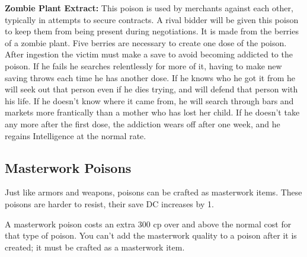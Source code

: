 \textbf{Zombie Plant Extract:} This poison is used by merchants against each other, typically in attempts to secure contracts. A rival bidder will be given this poison to keep them from being present during negotiations. It is made from the berries of a zombie plant. Five berries are necessary to create one dose of the poison. After ingestion the victim must make a save to avoid becoming addicted to the poison. If he fails he searches relentlessly for more of it, having to make new saving throws each time he has another dose. If he knows who he got it from he will seek out that person even if he dies trying, and will defend that person with his life. If he doesn't know where it came from, he will search through bars and markets more frantically than a mother who has lost her child. If he doesn't take any more after the first dose, the addiction wears off after one week, and he regains Intelligence at the normal rate.

\subsection{Masterwork Poisons}
Just like armors and weapons, poisons can be crafted as masterwork items. These poisons are harder to resist, their save DC increases by 1.

A masterwork poison costs an extra 300 cp over and above the normal cost for that type of poison. You can't add the masterwork quality to a poison after it is created; it must be crafted as a masterwork item.